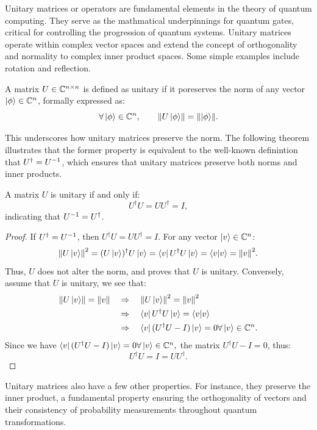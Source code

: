 \documentclass[12pt]{article}
\begin{document}
Unitary matrices or operators are fundamental elements in the theory of quantum computing. They serve as the mathmatical underpinnings for quantum gates, critical for controlling the progression of quantum systems. Unitary matrices operate within complex vector spaces and extend the concept of orthogonality and normality to complex inner product spaces. Some simple examples include rotation and reflection.

\begin{definition}
    A matrix $U \in \mathbb{C}^{n \times n}$ is defined as unitary if it poreserves the norm of any vector $\ket{\phi} \in \mathbb{C}^n$, formally expressed as:
    \[
    \forall \ket{\phi} \in \mathbb{C}^n, \qquad \norm{U \ket{\phi}} = \norm{\ket{\phi}}.
    \]
\end{definition}


This underscores how unitary matrices preserve the norm. The following theorem illustrates that the former property is equivalent to the well-known definintion that $U^\dagger = {U}^{-1}$, which ensures that unitary matrices preserve both norms and inner products. 

\begin{theorem}
    A matrix $U$ is unitary if and only if:
    \[
    U^\dagger U = U U^\dagger = I, 
    \]
    indicating that ${U}^{-1} = U^\dagger$. 
\end{theorem}

\begin{proof}
    If $U^\dagger = {U}^{-1}$, then $U^\dagger U = U U^\dagger = I$. For any vector $\ket{v} \in \mathbb{C}^n$:
    \[
    \norm{U \ket{v}}^2 = (U \ket{v})^\dagger U \ket{v} = \bra{v} U^\dagger U \ket{v} = \braket{v}{v} = \norm{v}^2. 
    \]
    Thus, $U$ does not alter the norm, and proves that $U$ is unitary. Conversely, assume that $U$ is unitary, we see that:
    \begin{align*}
        \norm{U \ket{v}} = \norm{v} \quad &\Rightarrow \quad \norm{U \ket{v}}^2 = \norm{v}^2 \\
        &\Rightarrow \quad \bra{v} U^\dagger U \ket{v} = \braket{v}{v} \\
        &\Rightarrow \quad \bra{v} (U^\dagger U - I) \ket{v}  = 0 \forall \ket{v} \in \mathbb{C}^n. \\
    \end{align*}
    Since we have $\bra{v} (U^\dagger U - I) \ket{v}  = 0 \forall \ket{v} \in \mathbb{C}^n,$ the matrix $U^\dagger U - I = 0$, thus:
    \[
    U^\dagger U = I = UU^\dagger.
    \]
\end{proof}

Unitary matrices also have a few other properties. For instance, they preserve the inner product, a fundamental property ensuring the orthogonality of vectors and their consistency of probability measurements throughout quantum transformations. 
\end{document}
